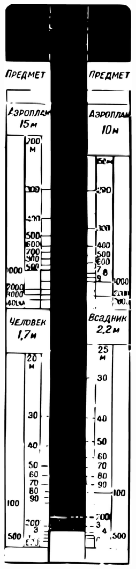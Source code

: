 \begin{marginfigure}%
\centering
\includegraphics[width=0.6\textwidth]{figures/ch-02/fig-040.pdf}
\end{marginfigure}

